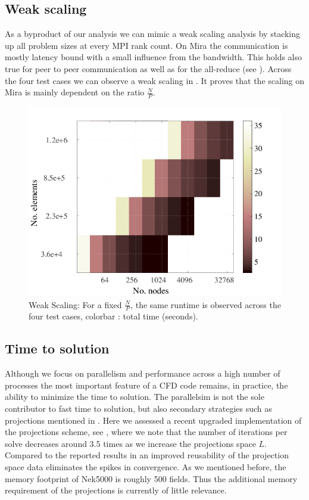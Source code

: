 \documentclass{sig-alternate}
\begin{document}
\subsection{Weak scaling}

As a byproduct of our analysis we can mimic a weak scaling analysis by stacking up 
all problem sizes at every MPI rank count. On Mira the communication is mostly 
latency bound with a small influence from the
bandwidth. This holds also true for peer to peer communication as well as for the
all-reduce (see ). Across the four test cases we can observe 
a weak scaling in . It proves that the scaling on Mira is 
mainly dependent on the ratio $\frac{N}{P}$. 

\begin{figure}
  \centering
  \includegraphics[trim=0 5 0 25,clip,width=\linewidth]{./figures/weak.png}
  \caption{Weak Scaling: For a fixed $\frac{N}{P}$, the same runtime is
  observed across the four test cases, colorbar : total time (seconds).}
  \label{fig:weakscaling}
\end{figure}

\subsection{Time to solution}
Although we focus on parallelism and performance across a high number of
processes the most important feature of a CFD code remains, in practice, the
ability to minimize the time to solution. The parallelsim is not the sole
contributor to fast time to solution, but also secondary strategies such as
projections mentioned in . Here we assessed a recent upgraded
implementation of the projections scheme, see , where we
note that the number of iterations per solve decreases around 3.5 times as we
increase the projections space $L$. Compared to the reported results in
\cite{Fischer1998} an improved reusability of the projection space data
eliminates the spikes in convergence. As we mentioned before, the memory
footprint of Nek5000 is roughly 500 fields. Thus the additional memory
requirement of the projections is currently of little relevance. 
\end{document}
